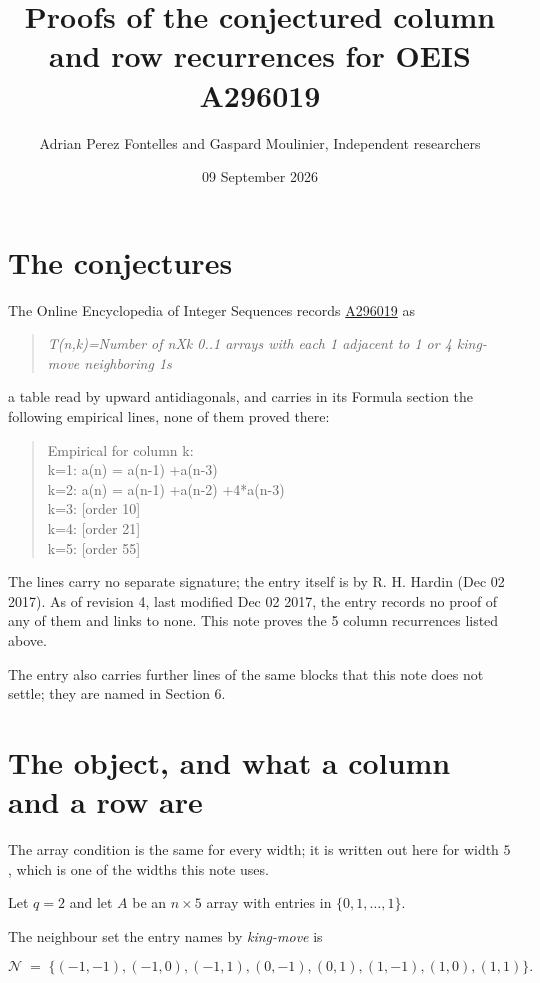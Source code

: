 \documentclass[11pt]{article}
\title{Proofs of the conjectured column and row recurrences for OEIS A296019}
\author{Adrian Perez Fontelles and Gaspard Moulinier, Independent researchers}
\date{09 September 2026}
\theoremstyle{definition}
\begin{document}
\maketitle
\section{The conjectures}

The Online Encyclopedia of Integer Sequences records \href{https://oeis.org/A296019}{A296019} as

\begin{quote}\itshape T(n,k)=Number of nXk 0..1 arrays with each 1 adjacent to 1 or 4 king-move neighboring 1s\end{quote}

a table read by upward antidiagonals, and carries in its Formula section the following empirical lines, none of them proved there:

\begin{quote}\ttfamily Empirical for column k:\\
k=1: a(n) = a(n-1) +a(n-3)\\k=2: a(n) = a(n-1) +a(n-2) +4*a(n-3)\\k=3: [order 10]\\k=4: [order 21]\\k=5: [order 55]\end{quote}

The lines carry no separate signature; the entry itself is by R. H. Hardin (Dec 02 2017). As of revision 4, last modified Dec 02 2017, the entry records no proof of any of them and links to none. This note proves the 5 column recurrences listed above.

The entry also carries further lines of the same blocks that this note does not settle; they are named in Section 6.

\section{The object, and what a column and a row are}

The array condition is the same for every width; it is written out here for width $5$, which is one of the widths this note uses.

Let $q = 2$ and let $A$ be an $n \times 5$ array with entries in $\{0,1,\dots,1\}$.

The neighbour set the entry names by {\itshape king-move} is

\[\mathcal{N} \;=\; \{(-1,-1), (-1,0), (-1,1), (0,-1), (0,1), (1,-1), (1,0), (1,1)\}.\]
\end{document}
